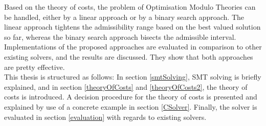 \documentclass{amsart}
\theoremstyle{definition}
\theoremstyle{remark}
\numberwithin{equation}{section}
\begin{document}
  Based on the theory of costs, the problem of Optimisation Modulo Theories can be handled, either by a linear approach or by a binary search approach. The linear approach tightens the admissibility range based on the best valued solution so far, whereas the binary search approach bisects the admissible interval.
  Implementations of the proposed approaches are evaluated in comparison to other existing solvers, and the results are discussed. They show that both approaches are pretty effective.\\
  
  This thesis is structured as follows: In section \ref{smtSolving}, SMT solving is briefly explained, and in section \ref{theoryOfCosts} and \ref{theoryOfCosts2}, the theory of costs is introduced. A decision procedure for the theory of costs is presented and explained by use of a concrete example in section \ref{CSolver}. Finally, the solver is evaluated in section \ref{evaluation} with regards to existing solvers.
\end{document}

